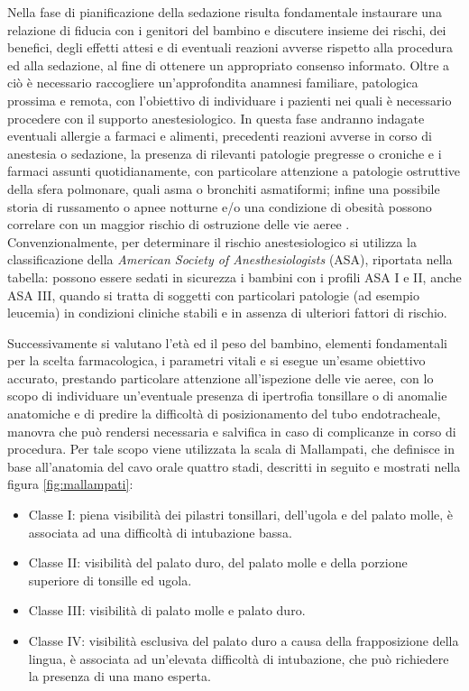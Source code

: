 Nella fase di pianificazione della sedazione risulta fondamentale instaurare una relazione di fiducia con i genitori del bambino e discutere insieme dei rischi, dei benefici, degli effetti attesi e di eventuali reazioni avverse rispetto alla procedura ed alla sedazione, al fine di ottenere un appropriato consenso informato. Oltre a ciò è necessario raccogliere un'approfondita anamnesi familiare, patologica prossima e remota, con l'obiettivo di individuare i pazienti nei quali è necessario procedere con il supporto anestesiologico. In questa fase andranno indagate eventuali allergie a farmaci e alimenti, precedenti reazioni avverse in corso di anestesia o sedazione, la presenza di rilevanti patologie pregresse o croniche e i farmaci assunti quotidianamente, con particolare attenzione a patologie ostruttive della sfera polmonare, quali asma o bronchiti asmatiformi; infine una possibile storia di russamento o apnee notturne e/o una condizione di obesità possono correlare con un maggior rischio di ostruzione delle vie aeree \cite{Simeupsedazione, Guidelines2019}.
Convenzionalmente, per determinare il rischio anestesiologico si utilizza la classificazione della \emph {American Society of Anesthesiologists} (ASA), riportata nella tabella: possono essere sedati in sicurezza i bambini con i profili ASA I e II, anche ASA III, quando si tratta di soggetti con particolari patologie (ad esempio leucemia) in condizioni cliniche stabili e in assenza di ulteriori fattori di rischio. 

\vfill

Successivamente si valutano l'età ed il peso del bambino, elementi fondamentali per la scelta farmacologica, i parametri vitali e si esegue un'esame obiettivo accurato, prestando particolare attenzione all'ispezione delle vie aeree, con lo scopo di individuare un'eventuale presenza di ipertrofia tonsillare o di anomalie anatomiche e di predire la difficoltà di posizionamento del tubo endotracheale, manovra che può rendersi necessaria e salvifica in caso di complicanze in corso di procedura. Per tale scopo viene utilizzata la scala di Mallampati, che definisce in base all'anatomia del cavo orale quattro stadi, descritti in seguito e mostrati nella figura \ref{fig:mallampati}:

\vfill

\begin{itemize}
    \item Classe I: piena visibilità dei pilastri tonsillari, dell'ugola e del palato molle, è associata ad una difficoltà di intubazione bassa.
    \item Classe II: visibilità del palato duro, del palato molle e della porzione superiore di tonsille ed ugola.
    \item Classe III: visibilità di palato molle e palato duro.
    \item Classe IV: visibilità esclusiva del palato duro a causa della frapposizione della lingua, è associata ad un'elevata difficoltà di intubazione, che può richiedere la presenza di una mano esperta. 
\end{itemize}

